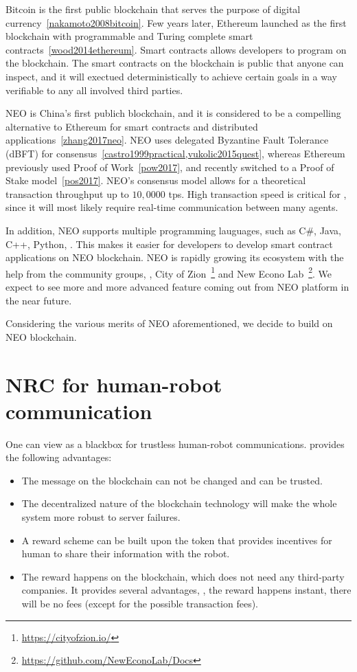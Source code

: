 \documentclass{article}
\begin{document}
Bitcoin is the first public blockchain that serves the purpose
of digital currency~\cref{nakamoto2008bitcoin}.
Few years later, Ethereum launched as the first blockchain with
programmable and Turing complete smart contracts~\cref{wood2014ethereum}.
Smart contracts allows developers to program on the blockchain.
The smart contracts on the blockchain is public that anyone
can inspect, and it will exectued deterministically to achieve
certain goals in a way verifiable to any all involved third
parties.

NEO is China's first publich blockchain, and it is considered to
be a compelling alternative to Ethereum for smart contracts and
distributed applications~\cref{zhang2017neo}.
NEO uses delegated Byzantine Fault Tolerance (dBFT) for 
consensus~\cref{castro1999practical,vukolic2015quest}, 
whereas Ethereum previously used Proof
of Work~\cref{pow2017}, and recently switched to a Proof of Stake
model~\cref{pos2017}.
NEO’s consensus model allows for 
a theoretical transaction throughput up to $10,0000$ tps.
High transaction speed is critical for \nrc, 
since it will most likely require 
real-time communication between many agents.


In addition, NEO supports multiple programming lauguages, such as C\#, Java,
C++, Python, \etc. This makes it easier for developers to develop
smart contract applications on NEO blockchain. 
NEO is rapidly growing its ecosystem with the help from the 
community groups, \eg, City of Zion~\footnote{\url{https://cityofzion.io/}} 
and New Econo Lab~\footnote{\url{https://github.com/NewEconoLab/Docs}}.
We expect to see more and more advanced feature coming out from NEO
platform in the near future.

Considering the various merits of NEO aforementioned, we decide to build
\nrc on NEO blockchain.


\section{NRC for human-robot communication}
\label{sec:nrc}


One can view \nrc as a blackbox for trustless human-robot
communications. \nrc provides the following advantages:


\begin{itemize}
    \item The message on the blockchain can not be changed and can
        be trusted.
    \item The decentralized nature of the blockchain technology 
        will make the
        whole system more robust to server failures.
    \item A reward scheme can be built upon the \nrc token 
        that provides incentives for human to share their information
        with the robot.
    \item The reward happens on the blockchain, which does not
        need any third-party companies. It provides several
        advantages, \eg, the reward happens instant, there will
        be no fees (except for the possible transaction fees).
\end{itemize}
\end{document}
